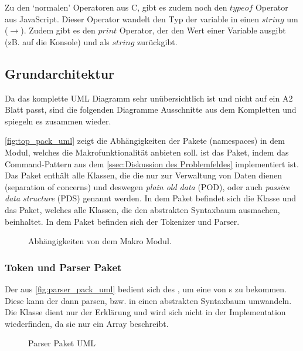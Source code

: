       Zu den `normalen' Operatoren aus C, gibt es zudem noch den \myMIn$typeof$ Operator aus JavaScript. Dieser Operator wandelt den Typ der variable in einen \myMIn$string$ um ($\rightarrow$). Zudem gibt es den \myMIn$print$ Operator, der den Wert einer Variable ausgibt (zB. auf die Konsole) und als \myMIn$string$ zurückgibt.

  \subsection{Grundarchitektur}
  \label{ssec:Grundarchitektur}
    Da das komplette UML Diagramm sehr unübersichtlich ist und nicht auf ein A2 Blatt passt, sind die folgenden Diagramme Ausschnitte aus dem Kompletten und spiegeln es zusammen wieder.

    \autoref{fig:top_pack_uml} zeigt die Abhängigkeiten der Pakete (namespaces) in dem Modul, welches die Makrofunktionalität anbieten soll.  ist das Paket, indem das Command-Pattern aus dem \autoref{ssec:Diskussion des Problemfeldes} implementiert ist. Das  Paket enthält alle Klassen, die die nur zur Verwaltung von Daten dienen (separation of concerns) und deswegen \emph{plain old data} (POD), oder auch \emph{passive data structure} (PDS) genannt werden. In dem  Paket befindet sich die  Klasse und das  Paket, welches alle Klassen, die den abstrakten Syntaxbaum ausmachen, beinhaltet. In dem  Paket befinden sich der Tokenizer und Parser.
    \begin{figure}[H]
      \centering
      \caption{Abhängigkeiten von dem Makro Modul.}
      \label{fig:top_pack_uml}
    \end{figure}

    \subsubsection{Token und Parser Paket}
    \label{sssec:Token und Parser Paket}
      Der  aus \autoref{fig:parser_pack_uml} bedient sich des , um eine  von s zu bekommen. Diese  kann der  dann parsen, bzw. in einen abstrakten Syntaxbaum umwandeln. Die  Klasse dient nur der Erklärung und wird sich nicht in der Implementation wiederfinden, da sie nur ein Array beschreibt.
      \begin{figure}[H]
        \centering
        \caption{Parser Paket UML}
        \label{fig:parser_pack_uml}
      \end{figure}

